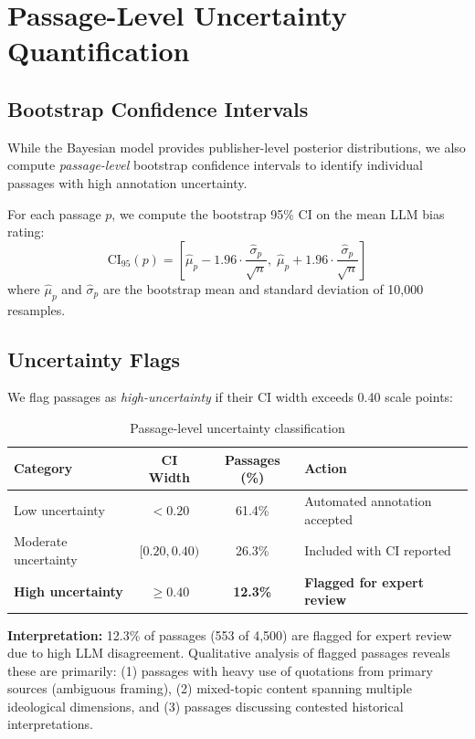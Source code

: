 \documentclass[11pt,a4paper]{article}
\begin{document}
\section{Passage-Level Uncertainty Quantification}

\subsection{Bootstrap Confidence Intervals}

While the Bayesian model provides publisher-level posterior distributions, we also compute \textit{passage-level} bootstrap confidence intervals to identify individual passages with high annotation uncertainty.

For each passage $p$, we compute the bootstrap 95\% CI on the mean LLM bias rating:
\begin{equation}
\text{CI}_{95}(p) = \left[\hat{\mu}_p - 1.96 \cdot \frac{\hat{\sigma}_p}{\sqrt{n}}, \;\hat{\mu}_p + 1.96 \cdot \frac{\hat{\sigma}_p}{\sqrt{n}}\right]
\end{equation}
where $\hat{\mu}_p$ and $\hat{\sigma}_p$ are the bootstrap mean and standard deviation of 10,000 resamples.

\subsection{Uncertainty Flags}

We flag passages as \textit{high-uncertainty} if their CI width exceeds 0.40 scale points:

\begin{table}[H]
\centering
\caption{Passage-level uncertainty classification}
\begin{tabular}{lccl}
\toprule
\textbf{Category} & \textbf{CI Width} & \textbf{Passages (\%)} & \textbf{Action} \\
\midrule
Low uncertainty & $< 0.20$ & 61.4\% & Automated annotation accepted \\
Moderate uncertainty & $[0.20, 0.40)$ & 26.3\% & Included with CI reported \\
\textbf{High uncertainty} & $\geq 0.40$ & \textbf{12.3\%} & \textbf{Flagged for expert review} \\
\bottomrule
\end{tabular}
\label{tab:uncertainty-flags}
\end{table}

\textbf{Interpretation:} 12.3\% of passages (553 of 4,500) are flagged for expert review due to high LLM disagreement. Qualitative analysis of flagged passages reveals these are primarily: (1) passages with heavy use of quotations from primary sources (ambiguous framing), (2) mixed-topic content spanning multiple ideological dimensions, and (3) passages discussing contested historical interpretations.
\end{document}
